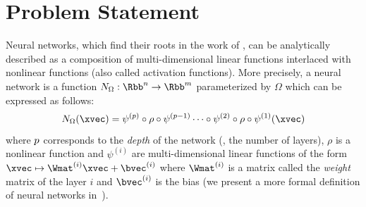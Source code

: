 %

\section{Problem Statement}
\label{section:ch1-problem_setting}



Neural networks, which find their roots in the work of \citet{mcculloch1943logical,rosenblatt1958perceptron}, can be analytically described as a composition of multi-dimensional linear functions interlaced with nonlinear functions (also called activation functions).
More precisely, a neural network is a function $N_{\Omega} : \Rbb^n \rightarrow \Rbb^m$ parameterized by $\Omega$ which can be expressed as follows:
\begin{equation} \label{equation:ch1-neural_network}
  N_{\Omega}(\xvec) = \psi^{(\depth)} \circ \rho \circ \psi^{(\depth-1)} \cdots \circ \psi^{(2)} \circ \rho \circ \psi^{(1)} (\xvec)
\end{equation}
where $p$ corresponds to the \emph{depth} of the network (\ie, the number of layers), $\rho$ is a nonlinear function and $\psi^{(i)}$ are multi-dimensional linear functions of the form $\xvec \mapsto \Wmat^{(i)} \xvec + \bvec^{(i)}$ where $\Wmat^{(i)}$ is a matrix called the \emph{weight} matrix of the layer $i$ and $\bvec^{(i)}$ is the bias (we present a more formal definition of neural networks in~).

